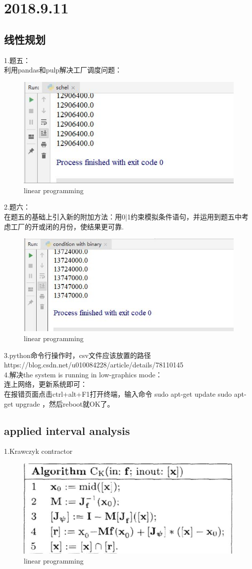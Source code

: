 \documentclass[UTF8]{ctexart}
\begin{document}
\section{2018.9.11}
\subsection{线性规划}
1.题五：\\
利用pandas和pulp解决工厂调度问题：\\
\begin{figure}
  \includegraphics[width=.8\linewidth]{sch.JPG}
  \caption{linear programming}
  \label{fig:boat1}
\end{figure}
2.题六：\\
在题五的基础上引入新的附加方法：用0|1约束模拟条件语句，并运用到题五中考虑工厂的开或闭的月份，使结果更可靠.\\
\begin{figure}
  \includegraphics[width=.8\linewidth]{binary.JPG}
  \caption{linear programming}
  \label{fig:boat1}
\end{figure}
3.python命令行操作时，csv文件应该放置的路径https://blog.csdn.net/u010084228/article/details/78110145\\
4.解决the system is running in low-graphics mode：\\
连上网络，更新系统即可：\\
在报错页面点击ctrl+alt+F1打开终端，输入命令 sudo apt-get update   sudo apt-get upgrade ，然后reboot就OK了。\\
\subsection{applied interval analysis}
1.Krawczyk contractor
\begin{figure}
  \includegraphics[width=.8\linewidth]{kra.JPG}
  \caption{linear programming}
  \label{fig:boat1}
\end{figure}
\end{document}
